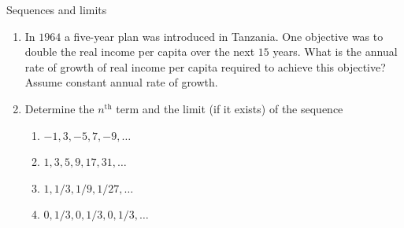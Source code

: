 \documentclass[9pt]{beamer}
\begin{document}
\begin{frame}{Sequences and limits}

    \begin{enumerate}[leftmargin = 0.5cm, label = \arabic*., rightmargin = 0.2cm]
        
        \item In $1964$ a five-year plan was introduced in Tanzania. One objective was to double the real income per capita over the next $15$ years. What is the annual rate of growth of real income per capita required to achieve this objective? Assume constant annual rate of growth.

        \item Determine the $n^{\text{th}}$ term and the limit (if it exists) of the sequence

        \begin{enumerate}[leftmargin = 0.5cm, label = (\alph*), rightmargin = 0.2cm]
            \item $-1, 3, -5, 7, -9, \dots$
            \item $1, 3, 5, 9, 17, 31, \dots$
            \item $1, 1/3, 1/9, 1/27, \dots$
            \item $0, 1/3, 0, 1/3, 0, 1/3, \dots$
        \end{enumerate}

    \end{enumerate}
    
\end{frame}
\end{document}
